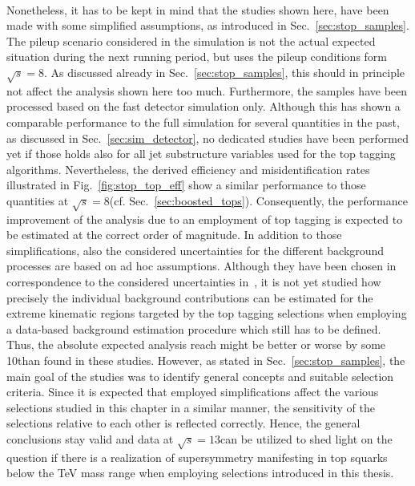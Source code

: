 \\
Nonetheless, it has to be kept in mind that the studies shown here, have been made with some simplified assumptions, as introduced in Sec.~\ref{sec:stop_samples}. The pileup scenario considered in the simulation is not the actual expected situation during the next running period, but uses the pileup conditions form $\sqrt{s} = 8$\tev. As discussed already in Sec.~\ref{sec:stop_samples}, this should in principle not affect the analysis shown here too much. Furthermore, the samples have been processed based on the fast detector simulation only. Although this has shown a comparable performance to the full simulation for several quantities in the past, as discussed in Sec.~\ref{sec:sim_detector}, no dedicated studies have been performed yet if those holds also for all jet substructure variables used for the top tagging algorithms. Nevertheless, the derived efficiency and misidentification rates illustrated in Fig.~\ref{fig:stop_top_eff} show a similar performance to those quantities at $\sqrt{s} = 8$\tev (cf. Sec.~\ref{sec:boosted_tops}). Consequently, the performance improvement of the analysis due to an employment of top tagging is expected to be estimated at the correct order of magnitude. In addition to those simplifications, also the considered uncertainties for the different background processes are based on ad hoc assumptions. Although they have been chosen in correspondence to the considered uncertainties in~\cite{CMS-PAS-SUS-13-015}, it is not yet studied how precisely the individual background contributions can be estimated for the extreme kinematic regions targeted by the top tagging selections when employing a data-based background estimation procedure which still has to be defined. Thus, the absolute expected analysis reach might be better or worse by some 10\gev than found in these studies. However, as stated in Sec.~\ref{sec:stop_samples}, the main goal of the studies was to identify general concepts and suitable selection criteria. Since it is expected that employed simplifications affect the various selections studied in this chapter in a similar manner, the sensitivity of the selections relative to each other is reflected correctly. Hence, the general conclusions stay valid and data at $\sqrt{s} = 13$\tev can be utilized to shed light on the question if there is a realization of supersymmetry manifesting in top squarks below the TeV mass range when employing selections introduced in this thesis.  


